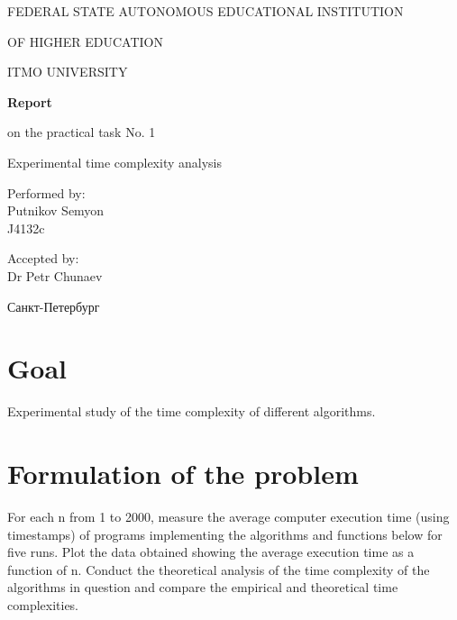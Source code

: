 \documentclass[a4paper,article,14pt]{extarticle}
\begin{document}
	\begin{titlepage}
		\begin{center}
			FEDERAL STATE AUTONOMOUS EDUCATIONAL INSTITUTION
			
			OF HIGHER EDUCATION
			
			ITMO UNIVERSITY
			\vspace{3cm}
			
			\large\textbf{Report}
			
			\large on the practical task No. 1
			
			\large \flqq Experimental time complexity analysis\frqq
			\vspace{5cm}
			

			\begin{flushright}
				{Performed by:} \\
				Putnikov Semyon \\ 
				J4132c \\
			\end{flushright}
			
			
			\begin{flushright}
				{Accepted by:} \\
				Dr Petr Chunaev \\ 
			\end{flushright}
			\vfill
			
			{Санкт-Петербург}
			\par{\number\year}
		\end{center}
	\end{titlepage}

	\newpage
	
	\section{Goal}
	Experimental study of the time complexity of different algorithms.
	
	\section{Formulation of the problem}
	For each n from 1 to 2000, measure the average computer execution time (using timestamps) of programs implementing the algorithms and functions below for five runs. Plot the data obtained showing the average execution time as a function of n. Conduct the theoretical analysis of the time complexity of the algorithms in question and compare the empirical and theoretical time complexities.
	
\end{document}
